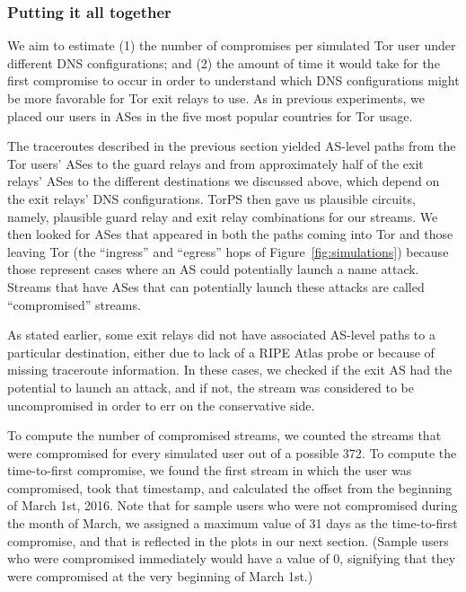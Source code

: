 \subsubsection{Putting it all together}
We aim to estimate (1) the number of compromises per simulated 
Tor user under different DNS configurations; and (2) the amount of 
time it would take for the first compromise to occur 
in order to understand which DNS configurations 
might be more favorable for Tor exit relays to use. As in previous 
experiments, we placed our users in ASes in the five most popular 
countries for Tor usage.

The traceroutes described in the previous section yielded AS-level paths from 
the Tor users' ASes to the guard relays and from approximately half of the exit 
relays' ASes to the different destinations we discussed above, which depend on the exit  
relays' DNS configurations. TorPS then gave us plausible 
circuits, namely, plausible guard relay and exit relay combinations for our 
streams. We then looked for ASes that appeared in both the paths coming into Tor and those 
leaving Tor (the ``ingress'' and ``egress'' hops of Figure~\ref{fig:simulations}) 
because those represent cases where an AS could potentially launch a name attack. 
Streams that have ASes that can potentially launch these attacks are called 
``compromised'' streams.

As stated earlier, some exit relays did not have associated AS-level paths to a particular 
destination, either due to lack of a RIPE Atlas probe or because of missing 
traceroute information. In these cases, we checked if the exit AS had the potential 
to launch an attack, and if not, the stream was considered to be uncompromised in order to 
err on the conservative side. 

To compute the number of compromised streams, we counted the streams that were compromised 
for every simulated user out of a possible 372. To compute the time-to-first compromise, 
we found the first stream in which the user was compromised, took that timestamp, and 
calculated the offset from the beginning of March 1st, 2016. Note that for sample users 
who were not compromised during the month of March, we assigned a maximum value 
of 31 days as the time-to-first compromise, and that is reflected in the plots in our 
next section. (Sample users who were compromised immediately would have a value of 0, 
signifying that they were compromised at the very beginning of March 1st.)

